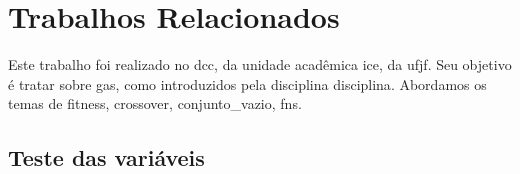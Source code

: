 \chapter{Trabalhos Relacionados}%
\label{cap:relacionados}


Este trabalho foi realizado no \gls{dcc}, da unidade acadêmica \gls{ice}, da \gls{ufjf}.
Seu objetivo é tratar sobre \glspl{ga}, como introduzidos pela disciplina \gls{disciplina}.
Abordamos os temas de \gls{fitness}, \gls{crossover}, \gls{conjunto_vazio}, \glspl{fn}.

\section{Teste das variáveis}%
\label{sec:teste_variaveis}

\testaVariaveis{}

\lipsum[1-20] %
